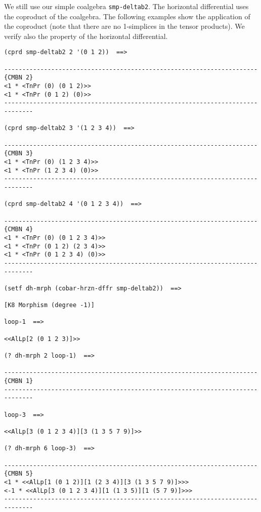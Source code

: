We still use our simple coalgebra {\tt smp-deltab2}. The horizontal differential uses the coproduct of the coalgebra.
The following examples show the application of the coproduct (note that there are no 1-simplices in the tensor
products). We verify also the property of the horizontal differential.
{\footnotesize\begin{verbatim}
(cprd smp-deltab2 2 '(0 1 2))  ==>

----------------------------------------------------------------------{CMBN 2}
<1 * <TnPr (0) (0 1 2)>>
<1 * <TnPr (0 1 2) (0)>>
------------------------------------------------------------------------------

(cprd smp-deltab2 3 '(1 2 3 4))  ==>

----------------------------------------------------------------------{CMBN 3}
<1 * <TnPr (0) (1 2 3 4)>>
<1 * <TnPr (1 2 3 4) (0)>>
------------------------------------------------------------------------------

(cprd smp-deltab2 4 '(0 1 2 3 4))  ==>

----------------------------------------------------------------------{CMBN 4}
<1 * <TnPr (0) (0 1 2 3 4)>>
<1 * <TnPr (0 1 2) (2 3 4)>>
<1 * <TnPr (0 1 2 3 4) (0)>>
------------------------------------------------------------------------------

(setf dh-mrph (cobar-hrzn-dffr smp-deltab2))  ==>

[K8 Morphism (degree -1)]

loop-1  ==>

<<AlLp[2 (0 1 2 3)]>>

(? dh-mrph 2 loop-1)  ==>

----------------------------------------------------------------------{CMBN 1}
------------------------------------------------------------------------------

loop-3  ==>

<<AlLp[3 (0 1 2 3 4)][3 (1 3 5 7 9)]>>

(? dh-mrph 6 loop-3)  ==>

----------------------------------------------------------------------{CMBN 5}
<1 * <<AlLp[1 (0 1 2)][1 (2 3 4)][3 (1 3 5 7 9)]>>>
<-1 * <<AlLp[3 (0 1 2 3 4)][1 (1 3 5)][1 (5 7 9)]>>>
------------------------------------------------------------------------------
\end{verbatim}}
\newpage
